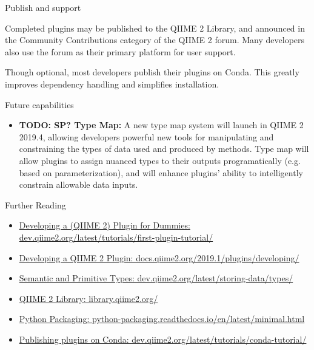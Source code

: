 \documentclass[final]{beamer}
\newlength{\colwidth}
\begin{document}
\begin{frame}[t]
\begin{columns}[t]
\begin{column}{\colwidth}
  \begin{block}{Publish and support}

    Completed plugins may be published to the QIIME 2 Library, and announced
    in the Community Contributions category of the QIIME 2 forum. Many developers
    also use the forum as their primary platform for user support.

    Though optional, most developers publish their plugins on Conda. This greatly
    improves dependency handling and simplifies installation.

  \end{block}

  \begin{block}{Future capabilities}

    \begin{itemize}
      \item \textbf{TODO: SP? Type Map:} A new type map system will launch in QIIME 2 2019.4,
      allowing developers powerful new tools for manipulating and constraining the types of
      data used and produced by methods. Type map will allow plugins to assign
      nuanced types to their outputs programatically (e.g. based on parameterization),
      and will enhance plugins' ability to intelligently constrain allowable data inputs.
    \end{itemize}

  \end{block}

  \begin{block}{Further Reading}
    \begin{itemize}
      \item \href{https://dev.qiime2.org/latest/tutorials/first-plugin-tutorial/}{Developing a (QIIME 2) Plugin for Dummies: dev.qiime2.org/latest/tutorials/first-plugin-tutorial/}
      \item \href{https://docs.qiime2.org/2019.1/plugins/developing/}{Developing a QIIME 2 Plugin: docs.qiime2.org/2019.1/plugins/developing/}
      \item \href{https://dev.qiime2.org/latest/storing-data/types/}{Semantic and Primitive Types: dev.qiime2.org/latest/storing-data/types/}
      \item \href{https://library.qiime2.org/}{QIIME 2 Library: library.qiime2.org/}
      \item \href{https://python-packaging.readthedocs.io/en/latest/minimal.html}{Python Packaging: python-packaging.readthedocs.io/en/latest/minimal.html}
      \item \href{https://dev.qiime2.org/latest/tutorials/conda-tutorial/}{Publishing plugins on Conda: dev.qiime2.org/latest/tutorials/conda-tutorial/}
    \end{itemize}
  \end{block}


\end{column}
\end{columns}
\end{frame}
\end{document}

